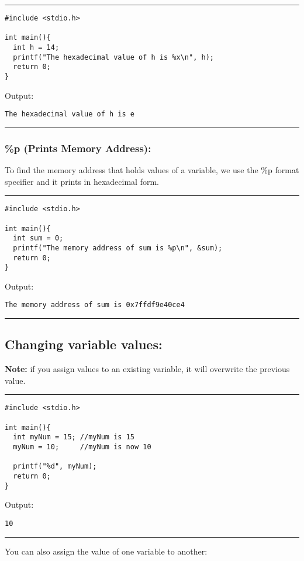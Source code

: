 \documentclass[a4paper]{article}
\begin{document}
\noindent\rule{\textwidth}{0.5pt}
\begin{verbatim}
#include <stdio.h>

int main(){
  int h = 14;
  printf("The hexadecimal value of h is %x\n", h);
  return 0;
}
\end{verbatim}
Output:
\begin{verbatim}
The hexadecimal value of h is e
\end{verbatim}

\noindent\rule{\textwidth}{0.5pt}

\subsubsection{\%p (Prints Memory Address):}
\label{sec:orga063913}
To find the memory address that holds values of a variable, we use the \%p format
specifier and it prints in hexadecimal form.

\noindent\rule{\textwidth}{0.5pt}
\begin{verbatim}
#include <stdio.h>

int main(){
  int sum = 0;
  printf("The memory address of sum is %p\n", &sum);
  return 0;
}
\end{verbatim}
Output:
\begin{verbatim}
The memory address of sum is 0x7ffdf9e40ce4
\end{verbatim}

\noindent\rule{\textwidth}{0.5pt}

\subsection{Changing variable values:}
\label{sec:orgce0802c}
\textbf{Note:} if you assign values to an existing variable, it will overwrite the
 previous value.

\noindent\rule{\textwidth}{0.5pt}
\begin{verbatim}
#include <stdio.h>

int main(){
  int myNum = 15; //myNum is 15
  myNum = 10;     //myNum is now 10

  printf("%d", myNum);
  return 0;
}
\end{verbatim}
Output:
\begin{verbatim}
10
\end{verbatim}

\noindent\rule{\textwidth}{0.5pt}

You can also assign the value of one variable to another:
\end{document}

